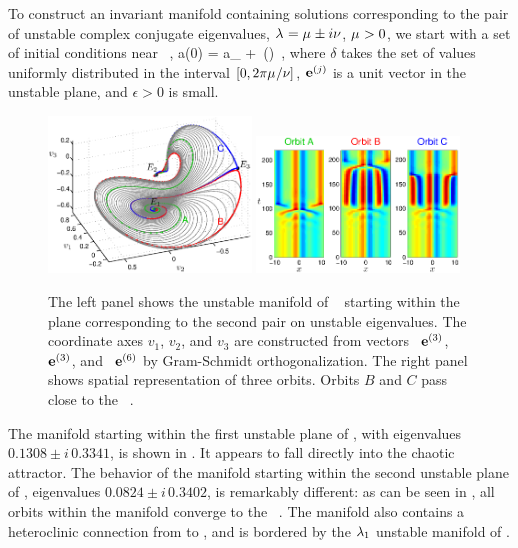 To construct an invariant manifold containing solutions
corresponding to the pair of unstable complex conjugate eigenvalues,
$\eigExp = \eigRe \pm i\eigIm$,
$\eigRe > 0$, we start with a set of
initial conditions near \eqv\ ,
\beq
  a(0) = a_{{}} + \epsilon\,\exp(\delta)
\,,
where $\delta$ takes the set of values uniformly distributed in the
interval $[0,2\pi\eigRe/\eigIm]$, $\jEigvec{j}$ is a unit vector in the
unstable plane, and $\epsilon > 0$ is small.

\begin{figure}[t]
\begin{center}
\includegraphics[width=0.48\textwidth]{figs/ks22_E1_plane2_manifold_c.eps}
\includegraphics[width=0.48\textwidth]{figs/ks22_E1_plane2_orbits_c.eps}
\end{center}
\caption{
The left panel shows the unstable
manifold of \eqv\  starting within the plane
corresponding to the second pair on unstable eigenvalues. The
coordinate axes $v_1$, $v_2$, and $v_3$ are constructed from vectors
\Re\, $\jEigvec{3}$, \Im\, $\jEigvec{3}$, and \Re\, $\jEigvec{6}$
by Gram-Schmidt orthogonalization.
The right panel shows spatial representation of three orbits. Orbits
$B$ and $C$ pass close to the \eqv\ .
   }
\label{f:KS22E1man2}
\end{figure}

The manifold starting within the first unstable plane of , with
eigenvalues $0.1308\pm i\,0.3341$, is shown in
. It appears to fall directly into the
chaotic attractor.  The behavior of the manifold starting within
the second unstable plane of , eigenvalues $0.0824\pm i \, 0.3402$, is
remarkably different: as can be seen in ,
all orbits within the manifold converge to the \eqv\ .  The
manifold also contains a heteroclinic connection from  to ,
and is bordered by the $\eigExp[1]$ unstable manifold of .

